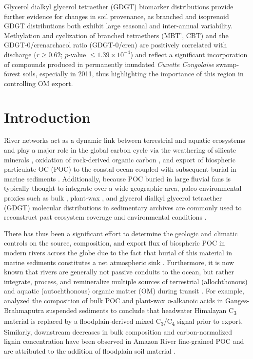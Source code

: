 Glycerol dialkyl glycerol tetraether (GDGT) biomarker distributions provide further evidence for changes in soil provenance, as branched and isoprenoid GDGT distributions both exhibit large seasonal and inter-annual variability. Methylation and cyclization of branched tetraethers (MBT', CBT) and the GDGT-0/crenarchaeol ratio (GDGT-0/cren) are positively correlated with discharge ($r \geq 0.62$; $p$-value $\leq 1.39 \times 10^{-4}$) and reflect a significant incorporation of compounds produced in permanently inundated \textit{Cuvette Congolaise} swamp-forest soils, especially in 2011, thus highlighting the importance of this region in controlling OM export.

\section{Introduction}

River networks act as a dynamic link between terrestrial and aquatic ecosystems and play a major role in the global carbon cycle via the weathering of silicate minerals \citep{Berner:1983uk,Gaillardet:1999uy}, oxidation of rock-derived organic carbon \citep[OC\textsubscript{petro};][]{Galy:2008ff,Bouchez:2010if,Hilton:2014dh}, and export of biospheric particulate OC (POC) to the coastal ocean coupled with subsequent burial in marine sediments \citep{Berner:1982vg,Galy:2007ev}. Additionally, because POC buried in large fluvial fans is typically thought to integrate over a wide geographic area, paleo-environmental proxies such as bulk , plant-wax , and glycerol dialkyl glycerol tetraether (GDGT) molecular distributions in sedimentary archives are commonly used to reconstruct past ecosystem coverage and environmental conditions \citep[\textit{e.g.}][]{FranceLanord:1994vp,Freeman:2001tv,Schefuss:2005jo,Weijers:2007fp}.

There has thus been a significant effort to determine the geologic and climatic controls on the source, composition, and export flux of biospheric POC in modern rivers across the globe due to the fact that burial of this material in marine sediments constitutes a net atmospheric  sink \citep{Lasaga:1985ts,Ludwig:1996ul,Galy:2015fx}. Furthermore, it is now known that rivers are generally not passive conduits to the ocean, but rather integrate, process, and remineralize multiple sources of terrestrial (allochthonous) and aquatic (autochthonous) organic matter (OM) during transit \citep{Cole:2007gp,Aufdenkampe:2011fm}. For example, \citet{Galy:2008jw,Galy:2011ix} analyzed the  composition of bulk POC and plant-wax \textit{n}-alkanoic acids in Ganges-Brahmaputra suspended sediments to conclude that headwater Himalayan C\textsubscript{3} material is replaced by a floodplain-derived mixed C\textsubscript{3}/C\textsubscript{4} signal prior to export. Similarly, downstream decreases in bulk  composition and carbon-normalized lignin concentration have been observed in Amazon River fine-grained POC and are attributed to the addition of floodplain soil material \citep{Hedges:1986ab,Hedges:2000tn}.

